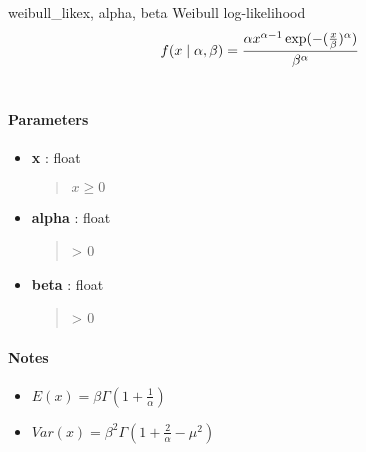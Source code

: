 \hypertarget{pymc.distributions.weibull_like}{}\begin{funcdesc}{weibull\_like}{x, alpha, beta}
Weibull log-likelihood
\begin{gather}
\begin{split}f(x \mid \alpha, \beta) = \frac{\alpha x^{\alpha - 1}
\exp(-(\frac{x}{\beta})^{\alpha})}{\beta^\alpha}\end{split}\notag\\\begin{split}\end{split}\notag
\end{gather}\paragraph{Parameters}\begin{itemize}

\item[] \textbf{x} : float
\begin{quote}

$x \ge 0$
\end{quote}

\item[] \textbf{alpha} : float
\begin{quote}

\textgreater{} 0
\end{quote}

\item[] \textbf{beta} : float
\begin{quote}

\textgreater{} 0
\end{quote}
\end{itemize}
\paragraph{Notes}
\begin{itemize}
\item {} 
$E(x)=\beta \Gamma(1+\frac{1}{\alpha})$

\item {} 
$Var(x)=\beta^2 \Gamma(1+\frac{2}{\alpha} - \mu^2)$

\end{itemize}
\end{funcdesc}

